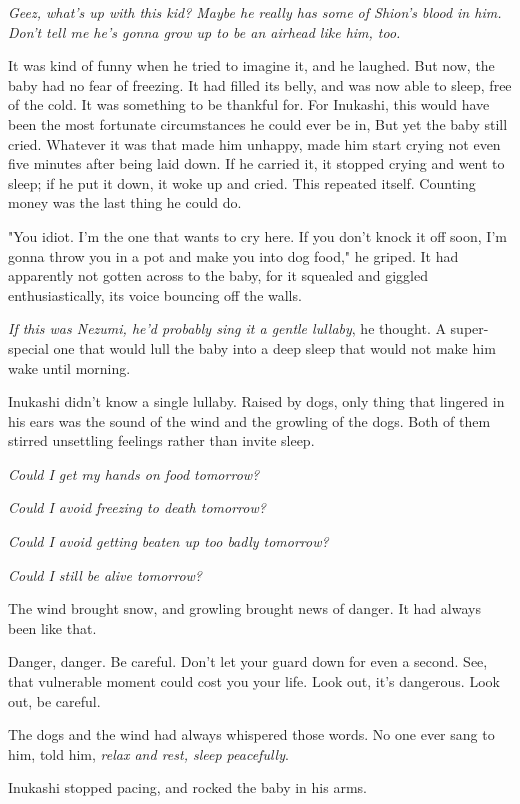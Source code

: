 \emph{Geez, what's up with this kid? Maybe he really has some of Shion's blood
in him. Don't tell me he's gonna grow up to be an airhead like him, too.}

It was kind of funny when he tried to imagine it, and he laughed. But
now, the baby had no fear of freezing. It had filled its belly, and was
now able to sleep, free of the cold. It was something to be thankful
for. For Inukashi, this would have been the most fortunate circumstances
he could ever be in, But yet the baby still cried. Whatever it was that
made him unhappy, made him start crying not even five minutes after
being laid down. If he carried it, it stopped crying and went to sleep;
if he put it down, it woke up and cried. This repeated itself. Counting
money was the last thing he could do.

"You idiot. I'm the one that wants to cry here. If you don't knock it
off soon, I'm gonna throw you in a pot and make you into dog food," he
griped. It had apparently not gotten across to the baby, for it squealed
and giggled enthusiastically, its voice bouncing off the walls.

\emph{If this was Nezumi, he'd probably sing it a gentle lullaby}, he thought.
A super-special one that would lull the baby into a deep sleep that
would not make him wake until morning.

Inukashi didn't know a single lullaby. Raised by dogs, only thing that
lingered in his ears was the sound of the wind and the growling of the
dogs. Both of them stirred unsettling feelings rather than invite sleep.

\emph{Could I get my hands on food tomorrow?}

\emph{Could I avoid freezing to death tomorrow?}

\emph{Could I avoid getting beaten up too badly tomorrow?}

\emph{Could I still be alive tomorrow?}

The wind brought snow, and growling brought news of danger. It had
always been like that.

Danger, danger. Be careful. Don't let your guard down for even a second.
See, that vulnerable moment could cost you your life. Look out, it's
dangerous. Look out, be careful.

The dogs and the wind had always whispered those words. No one ever sang
to him, told him, \emph{relax and rest, sleep peacefully}.

Inukashi stopped pacing, and rocked the baby in his arms.

